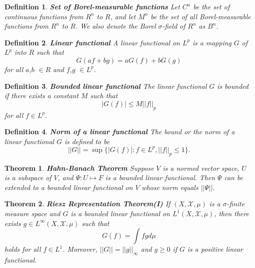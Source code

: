 \documentclass[12pt]{amsart}
\newtheorem{definition}{Definition}
\theoremstyle{plain}
\newtheorem{thm}{Theorem}[section]
\theoremstyle{definition}
\theoremstyle{remark}
\numberwithin{equation}{section}
\numberwithin{thm}{section}
\begin{document}
\begin{definition}
\textbf{Set of Borel-measurable functions}
    Let $C^n$ be the set of continuous functions from $R^n$ to $R$, and let $M^n$ be the set of all Borel-measurable functions from $R^n$ to $R$. We also denote the Borel $\sigma$-field of $R^n$ as $B^n$.
\end{definition}


\begin{definition} 
\textbf{Linear functional}  
A linear functional on $L^p$ is a mapping $G$ of $L^p$ into $R$ such that 
\begin{equation*}
 G(af+bg)=aG(f)+bG(g)    
\end{equation*}
for all $a$,$b$ $\in R$ and $f$,$g$ $\in L^p$.
\end{definition}

\begin{definition} 
\textbf{Bounded linear functional} 
The linear functional $G$ is bounded if there exists a constant $M$ such that 
\begin{equation*}
    |G(f)| \leq M||f||_p
\end{equation*}
for all $f \in L^p$.
\end{definition}

\begin{definition} 
\textbf{Norm of a linear functional}  The bound or the norm of a linear functional $G$ is defined to be 
\begin{equation*}
    ||G||=\sup{\{|G(f)|:f \in L^p, ||f||_p \leq 1\}}.
\end{equation*}
\end{definition}

\begin{thm}
\textbf{Hahn-Banach Theorem}
Suppose $V$ is a normed vector space, $U$ is a subspace of $V$, and $\Psi : U \mapsto F$ is a bounded linear functional. Then $\Psi$ can be extended to a bounded linear functional on $V$ whose norm equals $||\Psi||$.
\end{thm}
 
\begin{thm} 
\textbf{Riesz Representation Theorem(I)}
If $(X,\mathcal{X},\mu)$ is a $\sigma$-finite measure space and $G$ is a bounded linear functional on $L^1(X,\mathcal{X},\mu)$, then there exists $g \in L^\infty(X,\mathcal{X},\mu)$ such that 
\begin{equation*}
    G(f)=\int fg d\mu
\end{equation*}
holds for all $f \in L^1$. Moreover, $||G||=||g||_\infty$ and $g \geq 0$ if $G$ is a positive linear functional.
\end{thm}
 
\end{document}
